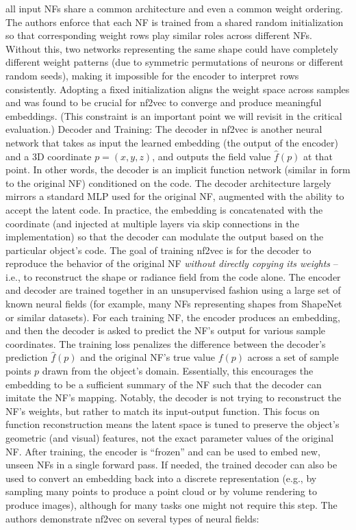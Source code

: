\documentclass[11pt]{article}
\begin{document}
all input NFs share a common architecture and even a common weight ordering. The authors enforce that each NF is trained from a shared random initialization so that corresponding weight rows play similar roles across different NFs. Without this, two networks representing the same shape could have completely different weight patterns (due to symmetric permutations of neurons or different random seeds), making it impossible for the encoder to interpret rows consistently. Adopting a fixed initialization aligns the weight space across samples and was found to be crucial for nf2vec to converge and produce meaningful embeddings. (This constraint is an important point we will revisit in the critical evaluation.) Decoder and Training: The decoder in nf2vec is another neural network that takes as input the learned embedding (the output of the encoder) and a 3D coordinate $p=(x,y,z)$, and outputs the field value $\hat{f}(p)$ at that point. In other words, the decoder is an implicit function network (similar in form to the original NF) conditioned on the code. The decoder architecture largely mirrors a standard MLP used for the original NF, augmented with the ability to accept the latent code. In practice, the embedding is concatenated with the coordinate (and injected at multiple layers via skip connections in the implementation) so that the decoder can modulate the output based on the particular object’s code. The goal of training nf2vec is for the decoder to reproduce the behavior of the original NF \emph{without directly copying its weights} – i.e., to reconstruct the shape or radiance field from the code alone. The encoder and decoder are trained together in an unsupervised fashion using a large set of known neural fields (for example, many NFs representing shapes from ShapeNet or similar datasets). For each training NF, the encoder produces an embedding, and then the decoder is asked to predict the NF’s output for various sample coordinates. The training loss penalizes the difference between the decoder’s prediction $\hat{f}(p)$ and the original NF’s true value $f(p)$ across a set of sample points $p$ drawn from the object’s domain. Essentially, this encourages the embedding to be a sufficient summary of the NF such that the decoder can imitate the NF’s mapping. Notably, the decoder is not trying to reconstruct the NF’s weights, but rather to match its input-output function. This focus on function reconstruction means the latent space is tuned to preserve the object’s geometric (and visual) features, not the exact parameter values of the original NF. After training, the encoder is “frozen” and can be used to embed new, unseen NFs in a single forward pass. If needed, the trained decoder can also be used to convert an embedding back into a discrete representation (e.g., by sampling many points to produce a point cloud or by volume rendering to produce images), although for many tasks one might not require this step. The authors demonstrate nf2vec on several types of neural fields:
\end{document}
